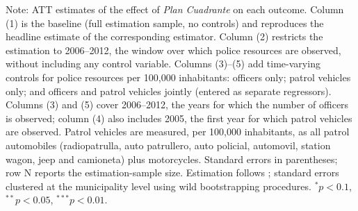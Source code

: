 \begin{table}[h!]
{\begin{threeparttable}
\begin{tabular}{l ccccc}
\bottomrule
\end{tabular}
\begin{tablenotes}[flushleft]
\item \footnotesize{Note: ATT estimates of the effect of \emph{Plan Cuadrante} on each outcome. Column (1) is the baseline (full estimation sample, no controls) and reproduces the headline estimate of the corresponding estimator. Column (2) restricts the estimation to 2006--2012, the window over which police resources are observed, without including any control variable. Columns (3)--(5) add time-varying controls for police resources per 100{,}000 inhabitants: officers only; patrol vehicles only; and officers and patrol vehicles jointly (entered as separate regressors). Columns (3) and (5) cover 2006--2012, the years for which the number of officers is observed; column (4) also includes 2005, the first year for which patrol vehicles are observed. Patrol vehicles are measured, per 100{,}000 inhabitants, as all patrol automobiles (radiopatrulla, auto patrullero, auto policial, automovil, station wagon, jeep and camioneta) plus motorcycles. Standard errors in parentheses; row N reports the estimation-sample size. Estimation follows \citet{Callaway}; standard errors clustered at the municipality level using wild bootstrapping procedures. $^{*}p<0.1$, $^{**}p<0.05$, $^{***}p<0.01$.}
\end{tablenotes}
\end{threeparttable}}
\end{table}
